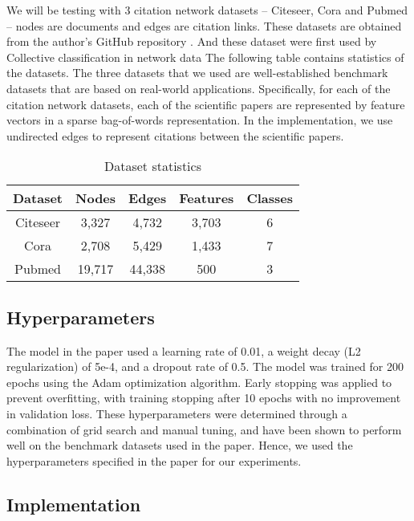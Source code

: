 \documentclass[11pt,a4paper]{article}
\begin{document}
We will be testing with 3 citation network datasets -- Citeseer, Cora and Pubmed -- nodes are documents and edges are citation links. These datasets are obtained from the author's GitHub repository \cite{kipf2016gcn}. And these dataset were first used by Collective classification in network data \cite{sen2008collective} The following table contains statistics of the datasets. The three datasets that we used are well-established benchmark datasets that are based on real-world applications. Specifically, for each of the citation network datasets, each of the scientific papers are represented by feature vectors in a sparse bag-of-words representation. In the implementation, we use undirected edges to represent citations between the scientific papers.

\begin{table}[h]
\centering
\begin{tabular}{|c|c|c|c|c|}
\hline
Dataset & Nodes & Edges & Features & Classes \\ \hline
Citeseer & 3,327 & 4,732 & 3,703 & 6 \\ \hline
Cora & 2,708 & 5,429 & 1,433 & 7 \\ \hline
Pubmed & 19,717 & 44,338 & 500 & 3 \\ \hline
\end{tabular}
\caption{Dataset statistics}
\end{table}

\subsection{Hyperparameters}

The model in the paper used a learning rate of 0.01, a weight decay (L2 regularization) of 5e-4, and a dropout rate of 0.5. The model was trained for 200 epochs using the Adam optimization algorithm. Early stopping was applied to prevent overfitting, with training stopping after 10 epochs with no improvement in validation loss. These hyperparameters were determined through a combination of grid search and manual tuning, and have been shown to perform well on the benchmark datasets used in the paper. Hence, we used the hyperparameters specified in the paper for our experiments.

\subsection{Implementation}
\end{document}
